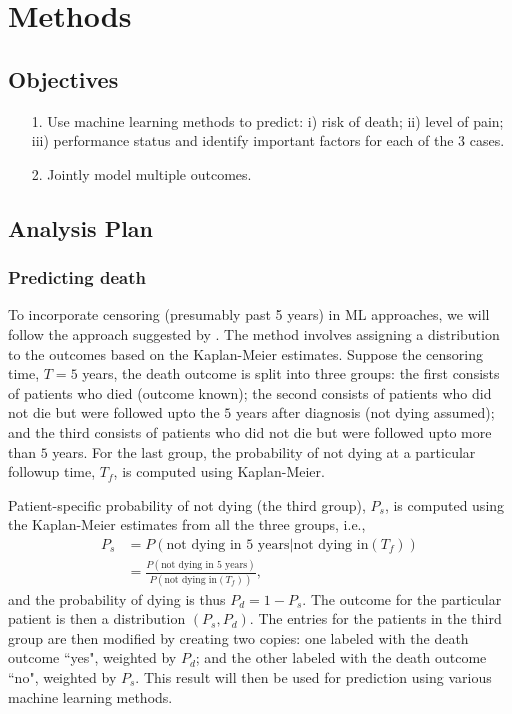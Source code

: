 \section{Methods}
\subsection{Objectives}
\begin{itemize}
\item[1.] Use machine learning methods to predict: i) risk of death; ii) level of pain; iii) performance status and identify important factors for each of the 3 cases.
\item[2.] Jointly model multiple outcomes.
\end{itemize}

\subsection{Analysis Plan}

\subsubsection{Predicting death}

To incorporate censoring (presumably past 5 years) in ML approaches, we will follow the approach suggested by \citet{zupan2000machine}. The method involves assigning a distribution to the outcomes based on the Kaplan-Meier estimates. Suppose the censoring time, $T = 5$ years, the death outcome is split into three groups: the first consists of patients who died (outcome known); the second consists of patients who did not die but were followed upto the $5$ years after diagnosis (not dying assumed); and the third consists of patients who did not die but were followed upto more than $5$ years. For the last group, the probability of not dying at a particular followup time, $T_f$, is computed using Kaplan-Meier. 

Patient-specific probability of not dying (the third group), $P_s$, is computed using the Kaplan-Meier estimates from all the three groups, i.e.,
\begin{align*}
P_s &= P(\text{not dying in 5 years}|\text{not dying in} (T_f))\\
 &= \frac{P(\text{not dying in 5 years})}{P(\text{not dying in} (T_f))},
\end{align*}
and the probability of dying is thus $P_d = 1 - P_s$. The outcome for the particular patient is then a distribution $(P_s, P_d)$. The entries for the patients in the third group are then modified by creating two copies: one labeled with the death outcome ``yes", weighted by $P_d$; and the other labeled with the death outcome ``no", weighted by $P_s$. This result will then be used for prediction using various machine learning methods.

